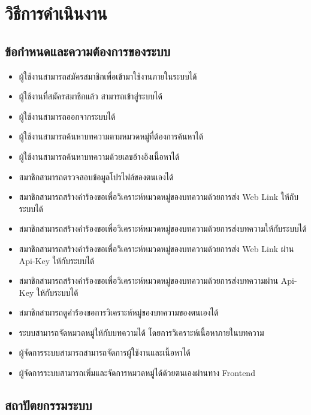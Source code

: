 \documentclass[12pt,oneside,openright,a4paper]{cpe-thai-project}
\begin{document}
\chapter{วิธีการดำเนินงาน}

\section{ข้อกำหนดและความต้องการของระบบ}
\begin{itemize}
  \item ผู้ใช้งานสามารถสมัครสมาชิกเพื่อเข้ามาใช้งานภายในระบบได้
  \item ผู้ใช้งานที่สมัครสมาชิกแล้ว สามารถเข้าสู่ระบบได้
  \item ผู้ใช้งานสามารถออกจากระบบได้
  \item ผู้ใช้งานสามารถค้นหาบทความตามหมวดหมู่ที่ต้องการค้นหาได้
  \item ผู้ใช้งานสามารถค้นหาบทความด้วยเลขอ้างอิงเนื้อหาได้
  \item สมาชิกสามารถตรวจสอบข้อมูลโปรไฟล์ของตนเองได้
  \item สมาชิกสามารถสร้างคำร้องขอเพื่อวิเคราะห์หมวดหมู่ของบทความด้วยการส่ง Web Link ให้กับระบบได้
  \item สมาชิกสามารถสร้างคำร้องขอเพื่อวิเคราะห์หมวดหมู่ของบทความด้วยการส่งบทความให้กับระบบได้
  \item สมาชิกสามารถสร้างคำร้องขอเพื่อวิเคราะห์หมวดหมู่ของบทความด้วยการส่ง Web Link ผ่าน Api-Key ให้กับระบบได้
  \item สมาชิกสามารถสร้างคำร้องขอเพื่อวิเคราะห์หมวดหมู่ของบทความด้วยการส่งบทความผ่าน Api-Key ให้กับระบบได้
  \item สมาชิกสามารถดูคำร้องขอการวิเคราะห์หมู่ของบทความของตนเองได้
  \item ระบบสามารถจัดหมวดหมู่ให้กับบทความได้ โดยการวิเคราะห์เนื้อหาภายในบทความ 
  \item ผู้จัดการระบบสามารถสามารถจัดการผู้ใช้งานและเนื้อหาได้
  \item ผู้จัดการระบบสามารถเพิ่มและจัดการหมวดหมู่ได้ด้วยตนเองผ่านทาง Frontend
\end{itemize}

\section{สถาปัตยกรรมระบบ}
\end{document}
